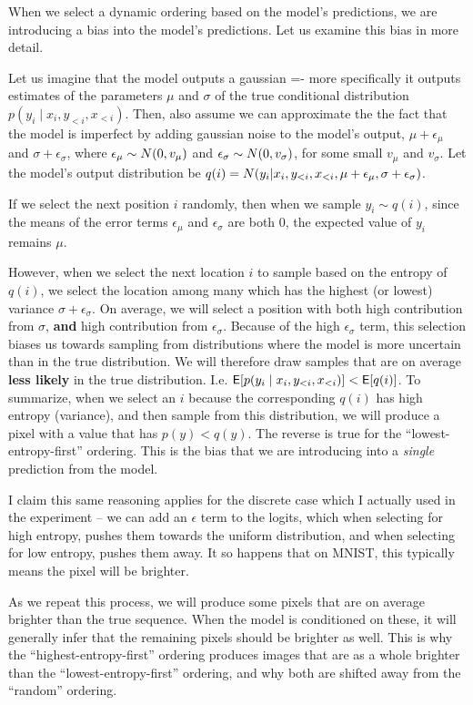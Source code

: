 When we select a dynamic ordering based on the model's predictions, we are introducing a bias into the model's predictions. Let us examine this bias in more detail.

Let us imagine that the model outputs a gaussian =- more specifically it outputs estimates of the parameters $\mu$ and $\sigma$ of the true conditional distribution $p(y_i \mid x_i, y_{<i}, x_{<i})$. Then, also assume we can approximate the the fact that the model is imperfect by adding gaussian noise to the model's output, $\mu + \epsilon_\mu$ and $\sigma + \epsilon_\sigma$, where $\epsilon_\mu \sim \relax{N}(0, v_\mu)$ and $\epsilon_\sigma \sim \relax{N}(0, v_\sigma)$, for some small $v_\mu$ and $v_\sigma$. Let the model's output distribution be $q(i) = \relax{N}(y_i | x_i, y_{<i}, x_{<i}, \mu + \epsilon_\mu, \sigma + \epsilon_\sigma)$.

If we select the next position $i$ randomly, then when we sample $y_i \sim q(i)$, since the means of the error terms $\epsilon_\mu$ and $\epsilon_\sigma$ are both 0, the expected value of $y_i$ remains $\mu$.

However, when we select the next location $i$ to sample based on the entropy of $q(i)$, we select the location among many which has the highest (or lowest) variance $\sigma + \epsilon_\sigma$. On average, we will select a position with both high contribution from $\sigma$, \textbf{and} high contribution  from $\epsilon_\sigma$. Because of the high $\epsilon_\sigma$ term, this selection biases us towards sampling from distributions where the model is more uncertain than in the true distribution. We will therefore draw samples that are on average \textbf{less likely} in the true distribution. I.e. $\mathsf{E}[p(y_i \mid x_i, y_{<i}, x_{<i})] < \mathsf{E}[q(i)]$. To summarize, when we select an $i$ because the corresponding $q(i)$ has high entropy (variance), and then sample from this distribution, we will produce a pixel with a value that has $p(y) < q(y)$. The reverse is true for the ``lowest-entropy-first'' ordering. This is the bias that we are introducing into a \textit{single} prediction from the model.

I claim this same reasoning applies for the discrete case which I actually used in the experiment -- we can add an $\epsilon$ term to the logits, which when selecting for high entropy, pushes them towards the uniform distribution, and when selecting for low entropy, pushes them away. It so happens that on MNIST, this typically means the pixel will be brighter.

As we repeat this process, we will produce some pixels that are on average brighter than the true sequence. When the model is conditioned on these, it will generally infer that the remaining pixels should be brighter as well. This is why the ``highest-entropy-first'' ordering produces images that are as a whole brighter than the ``lowest-entropy-first'' ordering, and why both are shifted away from the ``random'' ordering.
